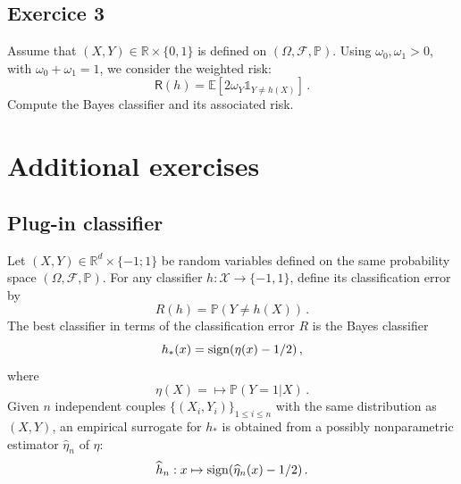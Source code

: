 \documentclass[a4paper,10pt,fleqn]{article}
\newcommand{\eqsp}{\,}
\newcommand{\calF}{\mathcal{F}}
\newcommand{\rset}{\ensuremath{\mathbb{R}}}
\newcommand{\bP}{\mathbb{P}}
\newcommand{\1}{\ensuremath{\mathbbm{1}}}
\newcommand{\bE}{\mathbb{E}}
\begin{document}
\subsection{Exercice 3}
Assume that $(X,Y)\in\mathbb{R}\times\{0,1\}$ is defined on $(\Omega,\mathcal{F},\mathbb{P})$. Using $\omega_0, \omega_1 >0$, with $\omega_0+\omega_1 = 1$, we  consider the weighted risk:
$$
\mathsf{R}(h) = \bE[2\omega_Y \mathds{1}_{Y\neq h(X)}]\,.
$$
 Compute the Bayes classifier and its associated risk.

\section{Additional exercises}
\subsection{Plug-in classifier}
Let $(X,Y)\in\rset^d\times\{-1;1\}$ be random variables defined on the same probability space $(\Omega,\calF,\bP)$.
For any classifier $h:\mathcal{X}\to \{-1,1\}$, define its classification error by
$$
R(h)=\bP(Y\neq h(X))\eqsp.
$$
The best classifier in terms of the classification error $R$ is the Bayes classifier
$$
h_{*}(x)={\rm sign}(\eta(x)-1/2)\eqsp,
$$
where
$$
\eta(X) = \mapsto\bP(Y=1|X)\eqsp.
$$
Given $n$ independent couples $\{(X_i,Y_i)\}_{1\leqslant i \leqslant n}$ with the same distribution as $(X,Y)$, an empirical surrogate for $h_{*}$ is obtained from a possibly nonparametric estimator $\widehat \eta_n$ of $\eta$:
$$
\widehat h_n: x\mapsto {\rm sign}(\widehat \eta_n(x)-1/2)\eqsp.
$$
\end{document}
